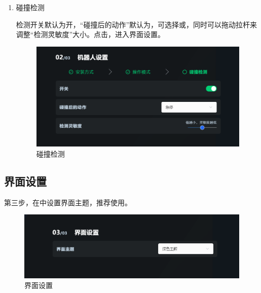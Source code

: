 \begin{enumerate}
\clearpage

\item 碰撞检测

	检测开关默认为开，“碰撞后的动作”默认为，可选择或，同时可以拖动拉杆来调整“检测灵敏度”大小。点击，进入界面设置。

	\begin{figure}[ht]
		\centering
		\includegraphics[width=\textwidth]{screen/2-8.png}
		\caption{碰撞检测}
		\label{fig:碰撞检测}
	\end{figure}


\end{enumerate}

\clearpage

\subsection{界面设置}

第三步，在中设置界面主题，推荐使用。

\begin{figure}[ht]
	\centering
	\includegraphics[width=\textwidth]{screen/2-9.png}
	\caption{界面设置}
	\label{fig:界面设置}
\end{figure}

